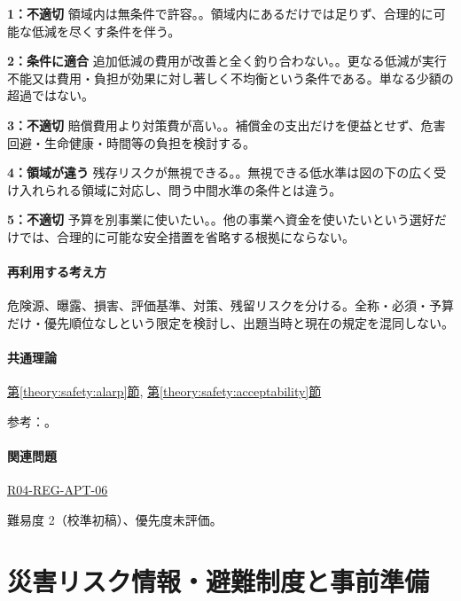\noindent\textbf{1：不適切} 領域内は無条件で許容。。領域内にあるだけでは足りず、合理的に可能な低減を尽くす条件を伴う。\par

\noindent\textbf{2：条件に適合} 追加低減の費用が改善と全く釣り合わない。。更なる低減が実行不能又は費用・負担が効果に対し著しく不均衡という条件である。単なる少額の超過ではない。\par

\noindent\textbf{3：不適切} 賠償費用より対策費が高い。。補償金の支出だけを便益とせず、危害回避・生命健康・時間等の負担を検討する。\par

\noindent\textbf{4：領域が違う} 残存リスクが無視できる。。無視できる低水準は図の下の広く受け入れられる領域に対応し、問う中間水準の条件とは違う。\par

\noindent\textbf{5：不適切} 予算を別事業に使いたい。。他の事業へ資金を使いたいという選好だけでは、合理的に可能な安全措置を省略する根拠にならない。\par

\paragraph{再利用する考え方} 危険源、曝露、損害、評価基準、対策、残留リスクを分ける。全称・必須・予算だけ・優先順位なしという限定を検討し、出題当時と現在の規定を混同しない。

\paragraph{共通理論} \hyperref[theory:safety:alarp]{第\ref*{theory:safety:alarp}節}, \hyperref[theory:safety:acceptability]{第\ref*{theory:safety:acceptability}節}

\par 参考：\cite{saf_parliament2006,saf_ra2006}。

\paragraph{関連問題} \hyperref[q:r04-reg-apt-06]{R04-REG-APT-06}

\par 難易度 2（校準初稿）、優先度未評価。

\section{災害リスク情報・避難制度と事前準備}

